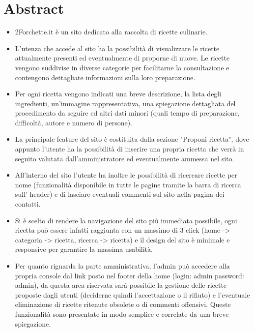 \documentclass[12pt]{article}
\begin{document}
	\section{Abstract}
	\begin{itemize}
		\item 2Forchette.it è un sito dedicato alla raccolta di ricette culinarie. 
		\item L'utenza che accede al sito ha la possibilità di visualizzare le ricette attualmente presenti ed eventualmente di proporne di nuove. Le ricette vengono suddivise in diverse categorie per facilitarne la consultazione e contengono dettagliate informazioni sulla loro preparazione.

		\item Per ogni ricetta vengono indicati una breve descrizione, la lista degli ingredienti, un'immagine rappresentativa, una spiegazione dettagliata del procedimento da seguire ed altri dati minori (quali tempo di preparazione, difficoltà, autore e numero di persone).

		\item La principale feature del sito è costituita dalla sezione "Proponi ricetta", dove appunto l'utente ha la possibilità di inserire una propria ricetta che verrà in seguito valutata dall'amministratore ed eventualmente ammessa nel sito.

		\item All'interno del sito l'utente ha inoltre le possibilità di ricercare ricette per nome (funzionalità disponibile in tutte le pagine tramite la barra di ricerca sull' header) e di lasciare eventuali commenti sul sito nella pagina dei contatti.

		\item Si è scelto di rendere la navigazione del sito più immediata possibile, ogni ricetta può essere infatti raggiunta con un massimo di 3 click (home -> categoria -> ricetta, ricerca -> ricetta) e il design del sito è minimale e responsive per garantire la massima usabilità.


		\item Per quanto riguarda la parte amministrativa, l'admin può accedere alla propria console dal link posto nel footer della home (login: admin password: admin), da questa area riservata sarà possibile la gestione delle ricette proposte dagli utenti (deciderne quindi l'accettazione o il rifiuto) e l'eventuale eliminazione di ricette ritenute obsolete o di commenti offensivi. Queste funzionalità sono presentate in modo semplice e correlate da una breve spiegazione.
	\end{itemize}
\end{document}
